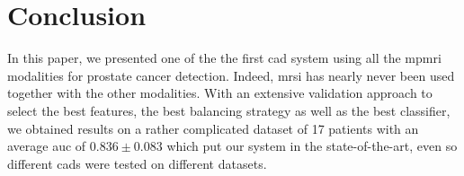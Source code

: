 \section{Conclusion}

In this paper, we presented one of the the first \ac{cad} system using all
the \ac{mpmri} modalities for prostate cancer detection.
Indeed, \ac{mrsi} has nearly never been used together with the other
modalities.
With an extensive validation approach to select the best
features, the best balancing strategy as well as the best classifier,
we obtained results on a rather complicated dataset of 17 patients
with an average \ac{auc} of $0.836 \pm 0.083$ which put our system in the
state-of-the-art, even so different \ac{cad}s were tested on different
datasets.

